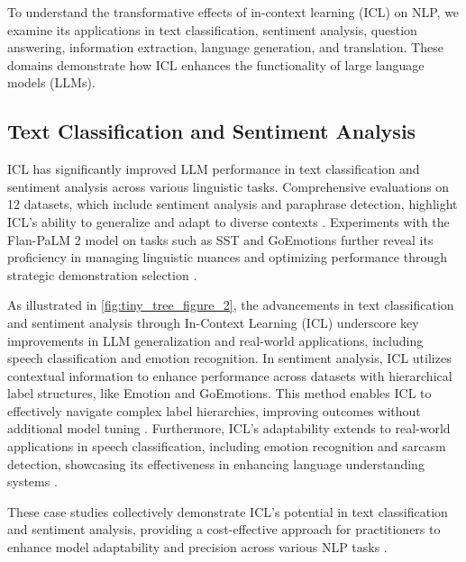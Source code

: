 To understand the transformative effects of in-context learning (ICL) on NLP, we examine its applications in text classification, sentiment analysis, question answering, information extraction, language generation, and translation. These domains demonstrate how ICL enhances the functionality of large language models (LLMs).


\subsection{Text Classification and Sentiment Analysis} \label{subsec:Text Classification and Sentiment Analysis}



ICL has significantly improved LLM performance in text classification and sentiment analysis across various linguistic tasks. Comprehensive evaluations on 12 datasets, which include sentiment analysis and paraphrase detection, highlight ICL's ability to generalize and adapt to diverse contexts \cite{ye2023compositionalexemplarsincontextlearning}. Experiments with the Flan-PaLM 2 model on tasks such as SST and GoEmotions further reveal its proficiency in managing linguistic nuances and optimizing performance through strategic demonstration selection \cite{gao2023ambiguity}. 

As illustrated in \autoref{fig:tiny_tree_figure_2}, the advancements in text classification and sentiment analysis through In-Context Learning (ICL) underscore key improvements in LLM generalization and real-world applications, including speech classification and emotion recognition. In sentiment analysis, ICL utilizes contextual information to enhance performance across datasets with hierarchical label structures, like Emotion and GoEmotions. This method enables ICL to effectively navigate complex label hierarchies, improving outcomes without additional model tuning \cite{milios2023incontextlearningtextclassification,chen2024retrievalstyleincontextlearningfewshot}. Furthermore, ICL's adaptability extends to real-world applications in speech classification, including emotion recognition and sarcasm detection, showcasing its effectiveness in enhancing language understanding systems \cite{mo2024ciclcontrastiveincontextlearning,zhou2024mysteryincontextlearningcomprehensive}.

These case studies collectively demonstrate ICL's potential in text classification and sentiment analysis, providing a cost-effective approach for practitioners to enhance model adaptability and precision across various NLP tasks \cite{zhou2024mysteryincontextlearningcomprehensive,mojarradi2024improvingincontextlearningsmall,han2023understandingincontextlearningsupportive,dong2024surveyincontextlearning}.
